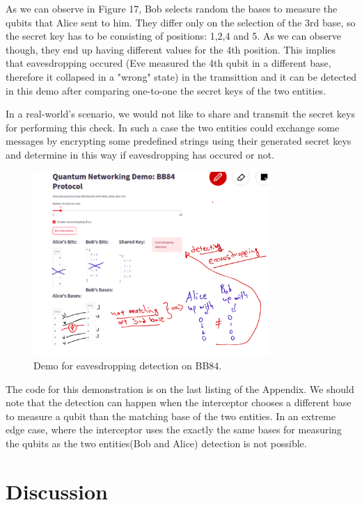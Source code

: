 \documentclass[12pt]{ieeetj}
\begin{document}
		As we can observe in Figure 17, Bob selects random the bases to measure the qubits that Alice sent to him.
		They differ only on the selection of the 3rd base, so the secret key has to be consisting of positions: 1,2,4 and 5.
		As we can observe though, they end up having different values for the 4th position.
		This implies that eavesdropping occured	(Eve measured the 4th qubit in a different base, therefore it collapsed in a "wrong" state)
		in the tramsittion and it can be detected in this demo after comparing one-to-one the secret keys of the two entities.

		In a real-world's scenario, we would not like to share and transmit the secret keys for performing this check. In such a case
		the two entities could exchange some messages by encrypting some predefined strings using their generated secret keys
		and determine in this way if eavesdropping has occured or not.
		
		
		\begin{figure}[H]
			\centering
			\includegraphics[width=0.8\textwidth]{bb84/inter_demo.png}
			\caption{Demo for eavesdropping detection on BB84.}
			\label{fig16:}
		\end{figure}		
		
		The code for this demonstration is on the last listing of the Appendix. We should note that
		the detection can happen when the interceptor chooses a different base to measure a qubit than the matching base of the two entities.
		In an extreme edge case, where the interceptor uses the exactly the same bases for measuring the qubits as the two entities(Bob and Alice)
		detection is not possible.

	\section{Discussion}
\end{document}
